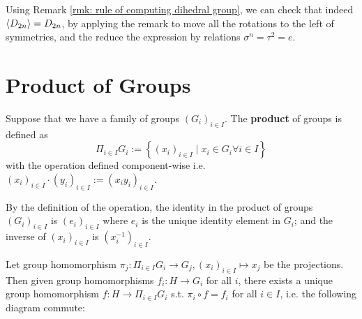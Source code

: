 \begin{remark}
    Using Remark \ref{rmk: rule of computing dihedral group}, we can check that indeed $\left\langle D_{2n} \right\rangle = D_{2n}$, by applying the remark to move all the rotations to the left of symmetries, and the reduce the expression by relations $\sigma^n = \tau^2 = e$. 
\end{remark}

\section{Product of Groups}

\begin{definition}
    Suppose that we have a family of groups $(G_i)_{i \in I}$. The \textbf{product} of groups is defined as
    \[
        \Pi_{i \in I} G_i := \left\{ (x_i)_{i \in I} \mid x_i \in G_i \forall i \in I \right\}
    \]
    with the operation defined component-wise i.e. $(x_i)_{i \in I} \cdot (y_i)_{i \in I} := (x_i y_i)_{i \in I}$.
\end{definition}

\begin{remark}
    By the definition of the operation, the identity in the product of groups $(G_i)_{i \in I}$ is $(e_i)_{i \in I}$ where $e_i$ is the unique identity element in $G_i$; and the inverse of $(x_i)_{i \in I}$ is $(x_i^{-1})_{i \in I}$.
\end{remark}

\begin{proposition}\label{prop: universal property of product of groups}
    Let group homomorphism $\pi_j: \Pi_{i \in I} G_i \to G_j, (x_i)_{i \in I} \mapsto x_j$ be the projections. Then given group homomorphisms $f_i: H \to G_i$ for all $i$, there exists a unique group homomorphism $f: H \to \Pi_{i \in I} G_i$ s.t. $\pi_i \circ f = f_i$ for all $i \in I$, i.e. the following diagram commute:

    \begin{minipage}{\linewidth}
        \centering
    \end{minipage}
\end{proposition}

